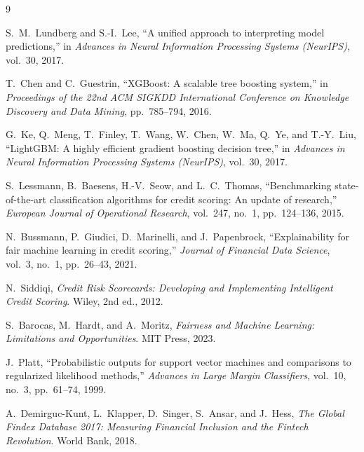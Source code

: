 \documentclass[11pt]{article}
\begin{document}
\begin{thebibliography}{9}

S.~M.~Lundberg and S.-I.~Lee,
``A unified approach to interpreting model predictions,''
in \emph{Advances in Neural Information Processing Systems (NeurIPS)},
vol.~30, 2017.

T.~Chen and C.~Guestrin,
``XGBoost: A scalable tree boosting system,''
in \emph{Proceedings of the 22nd ACM SIGKDD International Conference on
Knowledge Discovery and Data Mining}, pp.~785--794, 2016.

G.~Ke, Q.~Meng, T.~Finley, T.~Wang, W.~Chen, W.~Ma, Q.~Ye, and T.-Y.~Liu,
``LightGBM: A highly efficient gradient boosting decision tree,''
in \emph{Advances in Neural Information Processing Systems (NeurIPS)},
vol.~30, 2017.

S.~Lessmann, B.~Baesens, H.-V.~Seow, and L.~C.~Thomas,
``Benchmarking state-of-the-art classification algorithms for credit scoring:
An update of research,''
\emph{European Journal of Operational Research}, vol.~247, no.~1,
pp.~124--136, 2015.

N.~Bussmann, P.~Giudici, D.~Marinelli, and J.~Papenbrock,
``Explainability for fair machine learning in credit scoring,''
\emph{Journal of Financial Data Science}, vol.~3, no.~1,
pp.~26--43, 2021.

N.~Siddiqi,
\emph{Credit Risk Scorecards: Developing and Implementing Intelligent
Credit Scoring}.
Wiley, 2nd ed., 2012.

S.~Barocas, M.~Hardt, and A.~Moritz,
\emph{Fairness and Machine Learning: Limitations and Opportunities}.
MIT Press, 2023.

J.~Platt,
``Probabilistic outputs for support vector machines and comparisons to
regularized likelihood methods,''
\emph{Advances in Large Margin Classifiers}, vol.~10, no.~3,
pp.~61--74, 1999.

A.~Demirguc-Kunt, L.~Klapper, D.~Singer, S.~Ansar, and J.~Hess,
\emph{The Global Findex Database 2017: Measuring Financial Inclusion and
the Fintech Revolution}.
World Bank, 2018.

\end{thebibliography}
\end{document}
